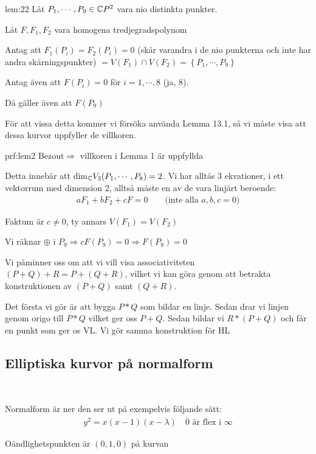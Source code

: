 \par\bigskip
\begin{lem}[2]{lem:22}
  Låt $P_1,\cdots,P_9\in\mathbb{C} P^2$ vara nio distinkta punkter.\par
  \noindent Låt $F, F_1, F_2$ vara homogena tredjegradspolynom\par
  \noindent Antag att $F_1(P_i) = F_2(P_i) = 0$ (skär varandra i de nio punkterna och inte har andra skärningspunkter) $= V(F_1)\cap V(F_2) = \left\{P_1,\cdots,P_9\right\}$\par
  \noindent Antag även att $F(P_i) = 0$ för $i=1,\cdots, 8$ (ja, 8).\par
  \noindent Då gäller även att $F(P_9)$
\end{lem}
\par\bigskip
\noindent För att vissa detta kommer vi försöka använda Lemma 13.1, så vi måste visa att dessa kurvor uppfyller de villkoren.
\par\bigskip
\begin{prf}[Lemma 2]{prf:lem2}
  Bezout$\Rightarrow$ villkoren i Lemma 1 är uppfyllda\par
  \noindent Detta innebär att dim$_{\mathbb{C}} V_3(P_1,\cdots, P_8)=2$. Vi har alltås 3 ekvationer, i ett vektorrum med dimension 2, alltså måste en av de vara linjärt beroende:
  \begin{equation*}
    \begin{gathered}
      aF_1+bF_2+cF = 0\qquad\text{(inte alla $a,b,c=0$)}
    \end{gathered}
  \end{equation*}\par
  \noindent Faktum är $c\neq0$, ty annars $V(F_1) = V(F_2)$
  \par\bigskip
  \noindent Vi räknar $\oplus$ i $P_9\Rightarrow cF(P_9)=0\Rightarrow F(P_9)=0$
\end{prf}
\newpage
\noindent Vi påminner oss om att vi vill visa associativiteten $(P+Q)+R = P+(Q+R)$, vilket vi kan göra genom att betrakta konstruktionen av $(P+Q)$ samt $(Q+R)$.\par
\noindent Det första vi gör är att bygga $P*Q$ som bildar en linje. Sedan drar vi linjen genom origo till $P*Q$ vilket ger oss $P+Q$. Sedan bildar vi $R*(P+Q)$ och får en punkt som ger os VL. Vi gör samma konstruktion för HL
\par\bigskip
\subsection{Elliptiska kurvor på normalform}\hfill\\\par
\noindent Normalform är ner den ser ut på exempelvis följande sätt:
\begin{equation*}
  \begin{gathered}
    y^2 = x(x-1)(x-\lambda)\quad \overline{0} \text{ är flex i }\infty
  \end{gathered}
\end{equation*}\par
\noindent Oändlighetspunkten är $(0,1,0)$ på kurvan
